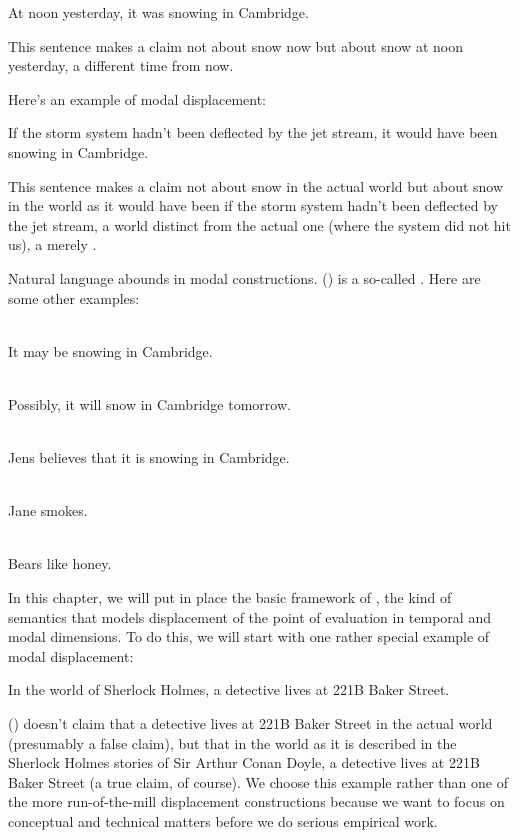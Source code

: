 \ex At noon yesterday, it was snowing in Cambridge. \xe

This sentence makes a claim not about snow now but about snow at noon yesterday,
a different time from now.

Here's an example of modal displacement:

\ex If the storm system hadn't been deflected by the jet stream, it would have
been snowing in Cambridge. \xe

This sentence makes a claim not about snow in the actual world but about snow in
the world as it would have been if the storm system hadn't been deflected by the
jet stream, a world distinct from the actual one (where the system did not hit
us), a merely .

Natural %
%
language abounds in modal constructions. (\lastx) is a so-called
. Here are some other examples:

\ex {}\\
It may be snowing in Cambridge. \xe

\ex {}\\
Possibly, it will snow in Cambridge tomorrow. \xe

\ex {}\\
Jens believes that it is snowing in Cambridge. \xe

\ex {}\\
Jane smokes. \xe

\ex {}\\
Bears like honey. \xe


In this chapter, we will put in place the basic framework of , the kind of semantics that models displacement of the point of
evaluation in temporal and modal dimensions. To do this, we will start with one
rather special example of modal displacement:

\ex\label{sherlock} In the world of Sherlock Holmes, a detective
lives at 221B Baker Street. \xe

(\lastx) doesn't claim that a
detective lives at 221B Baker Street in the actual world (presumably a false
claim), but that in the world as it is described in the Sherlock Holmes stories
of Sir Arthur Conan Doyle, a detective lives at 221B Baker Street (a true claim,
of course). We choose this example rather than one of the more run-of-the-mill
displacement constructions because we want to focus on conceptual and technical
matters before we do serious empirical work.

